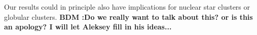 \documentclass[usenatbib,fleqn]{mn2e}
\newcommand{\Mdot}{\dot{M}}
\newcommand{\eddr}{\dot{M}/\dot{M}_{\rm Edd}}
\newcommand{\Mbh}[1][]{M_{\bullet#1}}
\newcommand{\vwO}{v_{w}}
\begin{document}
Our results could in principle also have implications for nuclear star clusters or globular clusters.  {\bf BDM :Do we really want to talk about this?  or is this an apology? I will let Aleksey fill in his ideas...}

  




\end{document}
